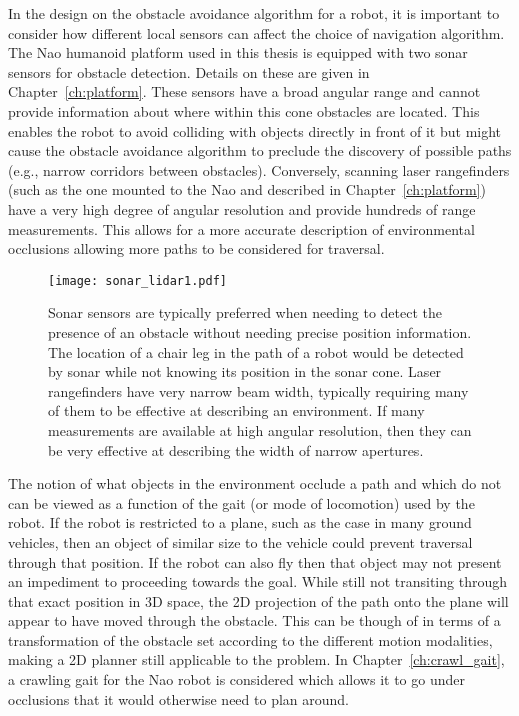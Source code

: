 In the design on the obstacle avoidance algorithm for a robot, it is important to consider how different local sensors 
can affect the choice of navigation algorithm. The Nao humanoid platform
used in this thesis is equipped with two sonar sensors for obstacle detection. Details on these are given in Chapter~\ref{ch:platform}.
These sensors have a broad angular range and cannot provide information about where within this cone obstacles are located.
This enables the robot to avoid colliding with objects directly in front of it but might cause the obstacle avoidance algorithm
to preclude the discovery of possible paths (e.g., narrow corridors between obstacles).
Conversely, scanning laser rangefinders (such as the one mounted to the Nao and described in Chapter~\ref{ch:platform}) have a
very high degree of angular resolution and provide hundreds of range measurements. This allows for a more accurate description
of environmental occlusions allowing more paths to be considered for traversal.
\begin{figure}
\centering
\texttt{[image: sonar\_lidar1.pdf]}
\caption{Sonar sensors are typically preferred when needing to detect the presence of an obstacle without
    	 needing precise position information. The location of a chair leg in the path of a robot would be
	     detected by sonar while not knowing its position in the sonar cone. Laser rangefinders have very
    	 narrow beam width, typically requiring many of them to be effective at describing an environment.
    	 If many measurements are available at high angular resolution, then they can be very effective at
    	 describing the width of narrow apertures.}\label{fig:sonar_vs_lidar1}
\end{figure}

The notion of what objects in the environment occlude a path and which do not can be viewed as a function of the gait 
(or mode of locomotion) used by the robot. If the robot is restricted to a plane, such as the case in many ground vehicles,
then an object of similar size to the vehicle could prevent traversal through that position. If the robot can also fly then
that object may not present an impediment to proceeding towards the goal.
While still not transiting through that exact position in 3D space, the 2D projection of the path onto
the plane will appear to have moved through the obstacle. This can be though of in terms of a transformation of the obstacle set according to the different
motion modalities, making a 2D planner still applicable to the problem. In Chapter~\ref{ch:crawl_gait},
a crawling gait for the Nao robot is considered which allows it to go under occlusions that it would otherwise need to plan
around.



